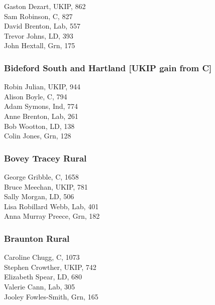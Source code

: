 \documentclass[a4paper,openany,10pt]{book}
\begin{document}


Gaston Dezart, UKIP, 862\\
Sam Robinson, C, 827\\
David Brenton, Lab, 557\\
Trevor Johns, LD, 393\\
John Hextall, Grn, 175\\


\subsubsection*{Bideford South and Hartland \hspace*{\fill}\nolinebreak[1]%
\enspace\hspace*{\fill}
[UKIP gain from C]}



Robin Julian, UKIP, 944\\
Alison Boyle, C, 794\\
Adam Symons, Ind, 774\\
Anne Brenton, Lab, 261\\
Bob Wootton, LD, 138\\
Colin Jones, Grn, 128\\


\subsubsection*{Bovey Tracey Rural}



George Gribble, C, 1658\\
Bruce Meechan, UKIP, 781\\
Sally Morgan, LD, 506\\
Lisa Robillard Webb, Lab, 401\\
Anna Murray Preece, Grn, 182\\


\subsubsection*{Braunton Rural}



Caroline Chugg, C, 1073\\
Stephen Crowther, UKIP, 742\\
Elizabeth Spear, LD, 680\\
Valerie Cann, Lab, 305\\
Jooley Fowles-Smith, Grn, 165\\
\end{document}
